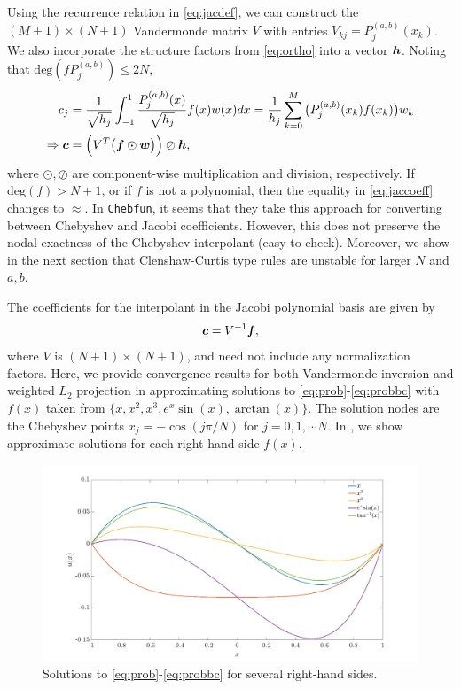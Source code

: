 Using the recurrence relation in \eqref{eq:jacdef}, we can construct the $(M+1)\times(N+1)$ Vandermonde matrix $V$ with entries $V_{kj} = P_{j}^{(a,b)}(x_k)$. We also incorporate the structure factors from \eqref{eq:ortho} into a vector $\boldsymbol{h}$. Noting that $\text{deg}(fP_j^{(a,b)}) \leq 2N$,
\begin{align}\label{eq:jaccoeff}
c_j &= \frac{1}{\sqrt{h_j}}\int_{-1}^1 \frac{P_j^{(a,b)}(x)}{\sqrt{h_j}}f(x)w(x)dx = \frac{1}{h_j}\sum_{k=0}^{M}\big(P_j^{(a,b)}(x_k)f(x_k)\big)w_k \nonumber\\
\Rightarrow \boldsymbol{c} &= \Big(V^{T}\big(\boldsymbol{f} \odot \boldsymbol{w}\big)\Big)\oslash\boldsymbol{h},
\end{align}
where $\odot,\oslash$ are component-wise multiplication and division, respectively. If $\text{deg}(f) > N+1$, or if $f$ is not a polynomial, then the equality in \eqref{eq:jaccoeff} changes to $\approx$. \color{red} In \texttt{Chebfun}, it seems that they take this approach for converting between Chebyshev and Jacobi coefficients. However, this does not preserve the nodal exactness of the Chebyshev interpolant (easy to check). Moreover, we show in the next section that Clenshaw-Curtis type rules are unstable for larger $N$ and $a,b$. \color{black}
%


The coefficients for the interpolant in the Jacobi polynomial basis are given by
\begin{equation}
\boldsymbol{c} = V^{-1}\boldsymbol{f},
\end{equation}
where $V$ is $(N+1) \times (N+1)$, and need not include any normalization factors.
Here, we provide convergence results for both Vandermonde inversion and weighted $L_2$ projection in approximating solutions to \eqref{eq:prob}-\eqref{eq:probbc} with $f(x)$ taken from $\big\{x,x^2,x^3,e^x\sin(x),\arctan(x)\big\}$. The solution nodes are the Chebyshev points $x_j = -\cos(j\pi/N)$ for $j=0,1,\cdots N$. In , we show approximate solutions for each right-hand side $f(x)$.
\begin{figure}[H]
	\centering
	\includegraphics[width=0.64\linewidth]{./figures/sols}
	\caption{Solutions to \eqref{eq:prob}-\eqref{eq:probbc} for several right-hand sides.}\label{fig:sols}
\end{figure}

